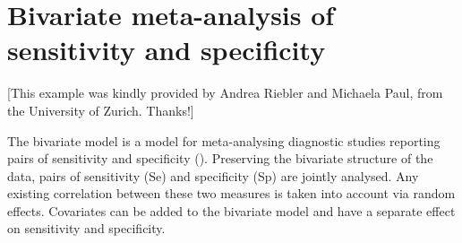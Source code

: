\documentclass[a4paper,11pt]{article}
\begin{document}


\section*{Bivariate meta-analysis of sensitivity and specificity}
{\small{[This example was kindly
        provided by Andrea Riebler and Michaela Paul, from the
        University of Zurich. Thanks!]}}

The bivariate model is a model for meta-analysing diagnostic studies
reporting pairs of sensitivity and specificity (\cite{bivariate2}).
Preserving the bivariate structure of the data, pairs of sensitivity
(Se) and specificity (Sp) are jointly analysed. Any existing
correlation between these two measures is taken into account via
random effects. Covariates can be added to the bivariate model and
have a separate effect on sensitivity and specificity.
\end{document}
